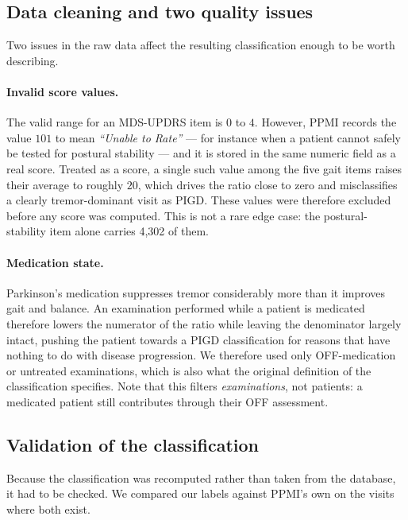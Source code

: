 \documentclass[11pt,a4paper]{article}
\begin{document}
\subsection{Data cleaning and two quality issues}
\label{sec:quality}

Two issues in the raw data affect the resulting classification enough to be
worth describing.

\paragraph{Invalid score values.}
The valid range for an MDS-UPDRS item is $0$ to $4$. However, PPMI records the
value $101$ to mean \emph{``Unable to Rate''} --- for instance when a patient
cannot safely be tested for postural stability --- and it is stored in the same
numeric field as a real score. Treated as a score, a single such value among the
five gait items raises their average to roughly $20$, which drives the ratio
close to zero and misclassifies a clearly tremor-dominant visit as PIGD. These
values were therefore excluded before any score was computed. This is not a rare
edge case: the postural-stability item alone carries 4{,}302 of them.

\paragraph{Medication state.}
Parkinson's medication suppresses tremor considerably more than it improves gait
and balance. An examination performed while a patient is medicated therefore
lowers the numerator of the ratio while leaving the denominator largely intact,
pushing the patient towards a PIGD classification for reasons that have nothing
to do with disease progression. We therefore used only OFF-medication or
untreated examinations, which is also what the original definition of the
classification specifies. Note that this filters \emph{examinations}, not
patients: a medicated patient still contributes through their OFF assessment.

\subsection{Validation of the classification}
\label{sec:validation}

Because the classification was recomputed rather than taken from the database,
it had to be checked. We compared our labels against PPMI's own on the visits
where both exist.
\end{document}
